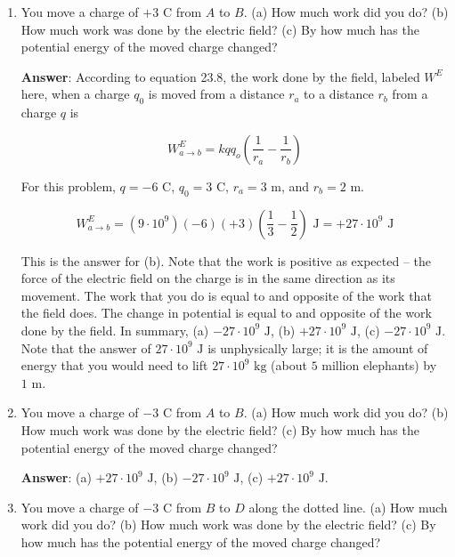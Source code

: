 \documentclass{article}
\begin{document}
\begin{enumerate}

  \item You move a charge of $+3\text{ C}$ from $A$ to $B$. (a) How much work did you do? (b) How much work was done by the electric field? (c) By how much has the potential energy of the moved charge changed?

        \ifsolutions
          \textbf{Answer}: According to equation 23.8, the work done by the field, labeled $W^E$ here, when a charge $q_0$ is moved from a distance $r_a$ to a distance $r_b$ from a charge $q$ is
        
          \begin{equation}
        W^E_{a\rightarrow b} = kqq_o\left(\frac{1}{r_a}-\frac{1}{r_b}\right)
        \end{equation}
        
          For this problem, $q=-6\text{ C}$, $q_0=3\text{ C}$, $r_a=3\text{ m}$, and $r_b=2\text{ m}$.
        
          \begin{equation}
        W^E_{a\rightarrow b} = (9\cdot 10^9)(-6)(+3)\left(\frac{1}{3}-\frac{1}{2}\right)\text{ J} = +27\cdot 10^9\text{ J}
        \end{equation}
        
          This is the answer for (b). Note that the work is positive as expected -- the force of the electric field on the charge is in the same direction as its movement. The work that you do is equal to and opposite of the work that the field does. The change in potential is equal to and opposite of the work done by the field. In summary, (a) $-27\cdot 10^9\text{ J}$, (b) $+27\cdot 10^9\text{ J}$, (c) $-27\cdot 10^9\text{ J}$. Note that the answer of $27\cdot 10^9\text{ J}$ is unphysically large; it is the amount of energy that you would need to lift $27\cdot 10^9\text{ kg}$ (about $5$ million elephants) by $1\text{ m}$. 
        \fi

  \item You move a charge of $-3\text{ C}$ from $A$ to $B$. (a) How much work did you do? (b) How much work was done by the electric field? (c) By how much has the potential energy of the moved charge changed?

        \ifsolutions
          \textbf{Answer}: (a) $+27\cdot 10^9\text{ J}$, (b) $-27\cdot 10^9\text{ J}$, (c) $+27\cdot 10^9\text{ J}$. 
        \fi

  \item You move a charge of $-3\text{ C}$ from $B$ to $D$ along the dotted line. (a) How much work did you do? (b) How much work was done by the electric field? (c) By how much has the potential energy of the moved charge changed?


\end{enumerate}
\end{document}
